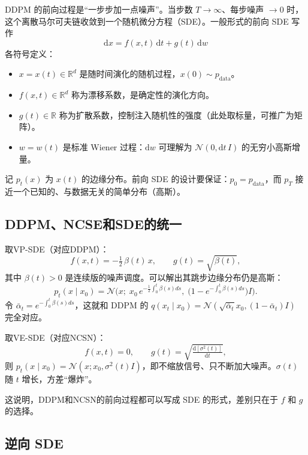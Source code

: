 DDPM 的前向过程是“一步步加一点噪声”。当步数 $T\to\infty$、每步噪声 $\to 0$ 时，这个离散马尔可夫链收敛到一个随机微分方程（SDE）。一般形式的前向 SDE 写作
\begin{equation}\label{eq:forward_sde}
\mathrm{d}x = f(x, t)\,\mathrm{d}t + g(t)\,\mathrm{d}w
\end{equation}
各符号定义：
\begin{itemize}
\item $x = x(t)\in\mathbb{R}^d$ 是随时间演化的随机过程，$x(0)\sim p_{\text{data}}$。
\item $f(x,t)\in\mathbb{R}^d$ 称为漂移系数，是确定性的演化方向。
\item $g(t)\in\mathbb{R}$ 称为扩散系数，控制注入随机性的强度（此处取标量，可推广为矩阵）。
\item $w = w(t)$ 是标准 Wiener 过程：$\mathrm{d}w$ 可理解为 $\mathcal N(0, \mathrm{d}t\, I)$ 的无穷小高斯增量。
\end{itemize}
记 $p_t(x)$ 为 $x(t)$ 的边缘分布。前向 SDE 的设计要保证：$p_0=p_{\text{data}}$，而 $p_T$ 接近一个已知的、与数据无关的简单分布（高斯）。

\subsection{DDPM、NCSE和SDE的统一}

取VP-SDE（对应DDPM）：
\begin{equation}
f(x,t) = -\tfrac12\,\beta(t)\,x, \qquad g(t) = \sqrt{\beta(t)},
\end{equation}
其中 $\beta(t)>0$ 是连续版的噪声调度。可以解出其跳步边缘分布仍是高斯：
\begin{equation}
p_t(x\mid x_0) = \mathcal N\!\Big(x;\; x_0\,e^{-\frac12\int_0^t\beta(s)ds},\;\big(1 - e^{-\int_0^t\beta(s)ds}\big)I\Big).
\end{equation}
令 $\bar\alpha_t = e^{-\int_0^t\beta(s)ds}$，这就和 DDPM 的 $q(x_t\mid x_0)=\mathcal N(\sqrt{\bar\alpha_t}x_0,(1-\bar\alpha_t)I)$ 完全对应。

取VE-SDE（对应NCSN）：
\begin{equation}
f(x,t) = 0, \qquad g(t) = \sqrt{\tfrac{\mathrm{d}[\sigma^2(t)]}{\mathrm{d}t}},
\end{equation}
则 $p_t(x\mid x_0)=\mathcal N(x; x_0, \sigma^2(t)I)$，即不缩放信号、只不断加大噪声。$\sigma(t)$ 随 $t$ 增长，方差“爆炸”。

这说明，DDPM和NCSN的前向过程都可以写成 SDE 的形式，差别只在于 $f$ 和 $g$ 的选择。

\subsection{逆向 SDE}

